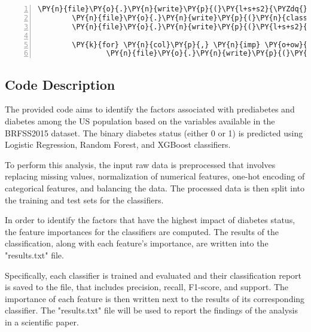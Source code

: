 \documentclass[12pt]{article}
\begin{document}
\begin{Verbatim}[commandchars=\\\{\},numbers=left,firstnumber=1,stepnumber=1,formatcom=\footnotesize]
        \PY{n}{file}\PY{o}{.}\PY{n}{write}\PY{p}{(}\PY{l+s+s2}{\PYZdq{}}\PY{l+s+se}{\PYZbs{}n}\PY{l+s+s2}{Results of XGBoost model:}\PY{l+s+se}{\PYZbs{}n}\PY{l+s+s2}{\PYZdq{}}\PY{p}{)}
        \PY{n}{file}\PY{o}{.}\PY{n}{write}\PY{p}{(}\PY{n}{classification\PYZus{}report}\PY{p}{(}\PY{n}{y\PYZus{}test}\PY{p}{,} \PY{n}{y\PYZus{}pred\PYZus{}xgb}\PY{p}{)}\PY{p}{)}
        \PY{n}{file}\PY{o}{.}\PY{n}{write}\PY{p}{(}\PY{l+s+s2}{\PYZdq{}}\PY{l+s+se}{\PYZbs{}n}\PY{l+s+s2}{Feature Importances (XGBoost):}\PY{l+s+se}{\PYZbs{}n}\PY{l+s+s2}{\PYZdq{}}\PY{p}{)}
    
        \PY{k}{for} \PY{n}{col}\PY{p}{,} \PY{n}{imp} \PY{o+ow}{in} \PY{n+nb}{zip}\PY{p}{(}\PY{n}{X}\PY{o}{.}\PY{n}{columns}\PY{p}{,} \PY{n}{xgb}\PY{o}{.}\PY{n}{feature\PYZus{}importances\PYZus{}}\PY{p}{)}\PY{p}{:}
                \PY{n}{file}\PY{o}{.}\PY{n}{write}\PY{p}{(}\PY{l+s+sa}{f}\PY{l+s+s2}{\PYZdq{}}\PY{l+s+si}{\PYZob{}}\PY{n}{col}\PY{l+s+si}{\PYZcb{}}\PY{l+s+s2}{: }\PY{l+s+si}{\PYZob{}}\PY{n}{imp}\PY{l+s+si}{\PYZcb{}}\PY{l+s+se}{\PYZbs{}n}\PY{l+s+s2}{\PYZdq{}}\PY{p}{)}
\end{Verbatim}
\subsection{Code Description}

The provided code aims to identify the factors associated with prediabetes and diabetes among the US population based on the variables available in the BRFSS2015 dataset. The binary diabetes status (either 0 or 1) is predicted using Logistic Regression, Random Forest, and XGBoost classifiers. 

To perform this analysis, the input raw data is preprocessed that involves replacing missing values, normalization of numerical features, one-hot encoding of categorical features, and balancing the data. The processed data is then split into the training and test sets for the classifiers.

In order to identify the factors that have the highest impact of diabetes status, the feature importances for the classifiers are computed. The results of the classification, along with each feature's importance, are written into the "results.txt" file.

Specifically, each classifier is trained and evaluated and their classification report is saved to the file, that includes precision, recall, F1-score, and support. The importance of each feature is then written next to the results of its corresponding classifier. The "results.txt" file will be used to report the findings of the analysis in a scientific paper.
\end{document}
